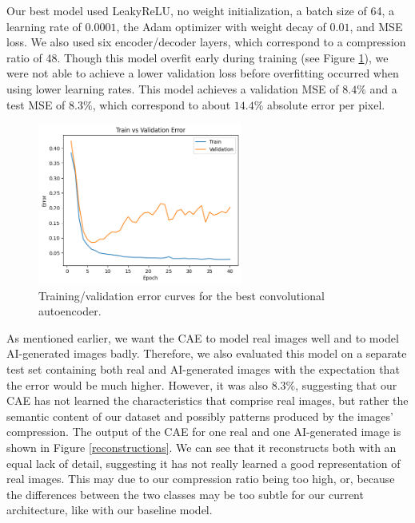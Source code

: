 \documentclass{article} %
\begin{document}
Our best model used LeakyReLU, no weight initialization, a batch size of 64, a learning rate of $0.0001$, the Adam optimizer with weight decay of $0.01$, and MSE loss. We also used six encoder/decoder layers, which correspond to a compression ratio of 48. Though this model overfit early during training (see Figure \ref{cae_curves}), we were not able to achieve a lower validation loss before overfitting occurred when using lower learning rates. This model achieves a validation MSE of $8.4\%$ and a test MSE of $8.3\%$, which correspond to about $14.4\%$ absolute error per pixel.

\begin{figure}[h]
    \label{cae_curves}
    \begin{center}
        \includegraphics[width=0.6\textwidth]{figs/cae_error_curves.png}
    \end{center}
    \caption{Training/validation error curves for the best convolutional autoencoder.}
\end{figure}

As mentioned earlier, we want the CAE to model real images well and to model AI-generated images badly. Therefore, we also evaluated this model on a separate test set containing both real and AI-generated images with the expectation that the error would be much higher. However, it was also $8.3\%$, suggesting that our CAE has not learned the characteristics that comprise real images, but rather the semantic content of our dataset and possibly patterns produced by the images' compression. The output of the CAE for one real and one AI-generated image is shown in Figure \ref{reconstructions}. We can see that it reconstructs both with an equal lack of detail, suggesting it has not really learned a good representation of real images. This may due to our compression ratio being too high, or, because the differences between the two classes may be too subtle for our current architecture, like with our baseline model.
\end{document}
